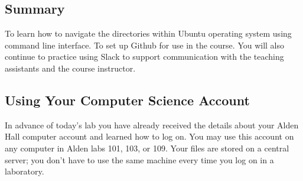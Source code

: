 
\newcommand{\command}[1]{``\lstinline{#1}''}
\newcommand{\program}[1]{\lstinline{#1}}
\newcommand{\channel}[1]{\lstinline{#1}}
\newcommand{\option}[1]{``{#1}''}
\newcommand{\step}[1]{``{#1}''}



\subsection*{Summary}
To learn how to navigate the directories within Ubuntu operating system using command line interface. To set up Github for use in the course. You will
also continue to practice using Slack to support communication with the teaching assistants and the course instructor.


\vspace*{-.2in}
\subsection*{Using Your Computer Science Account}
\vspace*{-.1in}
In advance of today's lab you have already received the details about your Alden Hall computer account and learned how
to log on. You may use this account on any computer in Alden labs 101, 103, or
109. Your files are stored on a central server; you don't have to use the same machine every time you log on in a laboratory.


